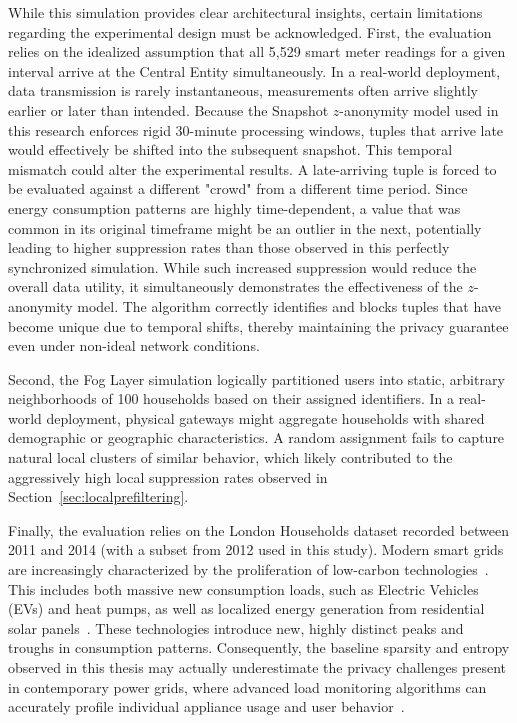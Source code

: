 While this simulation provides clear architectural insights, certain limitations regarding the experimental design must be acknowledged. First, the evaluation relies on the idealized assumption that all 5,529 smart meter readings for a given interval arrive at the Central Entity simultaneously. In a real-world deployment, data transmission is rarely instantaneous, measurements often arrive slightly earlier or later than intended. Because the Snapshot $z$-anonymity model used in this research enforces rigid 30-minute processing windows, tuples that arrive late would effectively be shifted into the subsequent snapshot. This temporal mismatch could alter the experimental results. A late-arriving tuple is forced to be evaluated against a different "crowd" from a different time period. Since energy consumption patterns are highly time-dependent, a value that was common in its original timeframe might be an outlier in the next, potentially leading to higher suppression rates than those observed in this perfectly synchronized simulation. While such increased suppression would reduce the overall data utility, it simultaneously demonstrates the effectiveness of the $z$-anonymity model. The algorithm correctly identifies and blocks tuples that have become unique due to temporal shifts, thereby maintaining the privacy guarantee even under non-ideal network conditions.

Second, the Fog Layer simulation logically partitioned users into static, arbitrary neighborhoods of 100 households based on their assigned identifiers. In a real-world deployment, physical gateways might aggregate households with shared demographic or geographic characteristics. A random assignment fails to capture natural local clusters of similar behavior, which likely contributed to the aggressively high local suppression rates observed in Section~\ref{sec:localprefiltering}.

Finally, the evaluation relies on the London Households dataset recorded between 2011 and 2014 (with a subset from 2012 used in this study). Modern smart grids are increasingly characterized by the proliferation of low-carbon technologies~\cite{DataVariability}. This includes both massive new consumption loads, such as Electric Vehicles (EVs) and heat pumps, as well as localized energy generation from residential solar panels~\cite{NewConsumptionLoads}. These technologies introduce new, highly distinct peaks and troughs in consumption patterns. Consequently, the baseline sparsity and entropy observed in this thesis may actually underestimate the privacy challenges present in contemporary power grids, where advanced load monitoring algorithms can accurately profile individual appliance usage and user behavior~\cite{NILM}.


